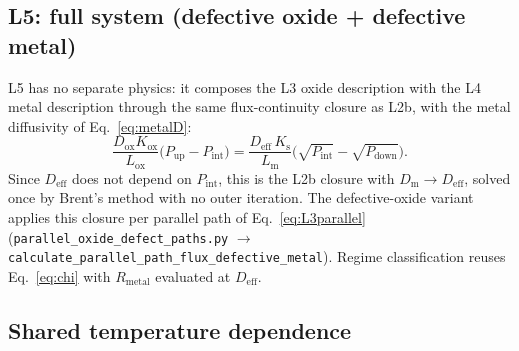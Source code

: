 \documentclass[11pt,a4paper]{article}
\newcommand{\Pup}{P_{\mathrm{up}}}
\newcommand{\Pdown}{P_{\mathrm{down}}}
\newcommand{\Pint}{P_{\mathrm{int}}}
\newcommand{\Ks}{K_{\mathrm{s}}}
\newcommand{\Kox}{K_{\mathrm{ox}}}
\newcommand{\Dm}{D_{\mathrm{m}}}
\newcommand{\Dox}{D_{\mathrm{ox}}}
\newcommand{\Deff}{D_{\mathrm{eff}}}
\newcommand{\Lm}{L_{\mathrm{m}}}
\newcommand{\Lox}{L_{\mathrm{ox}}}
\newcommand{\Rmet}{R_{\mathrm{metal}}}
\newcommand{\code}[1]{\texttt{#1}}
\begin{document}
\subsection{L5: full system (defective oxide + defective metal)}

L5 has no separate physics: it composes the L3 oxide description with the L4
metal description through the same flux-continuity closure as L2b, with the
metal diffusivity of Eq.~\eqref{eq:metalD}:
\begin{equation}
  \frac{\Dox\Kox}{\Lox}\bigl(\Pup - \Pint\bigr)
  =
  \frac{\Deff\,\Ks}{\Lm}\bigl(\sqrt{\Pint} - \sqrt{\Pdown}\bigr).
  \label{eq:closureL5}
\end{equation}
Since $\Deff$ does not depend on $\Pint$, this is the L2b closure with
$\Dm \rightarrow \Deff$, solved once by Brent's method with no outer iteration. The
defective-oxide variant applies this closure per parallel path of
Eq.~\eqref{eq:L3parallel} (\code{parallel\_oxide\_defect\_paths.py} $\rightarrow$
\code{calculate\_parallel\_path\_flux\_defective\_metal}). Regime
classification reuses Eq.~\eqref{eq:chi} with $\Rmet$ evaluated at $\Deff$.

\subsection{Shared temperature dependence}
\end{document}
